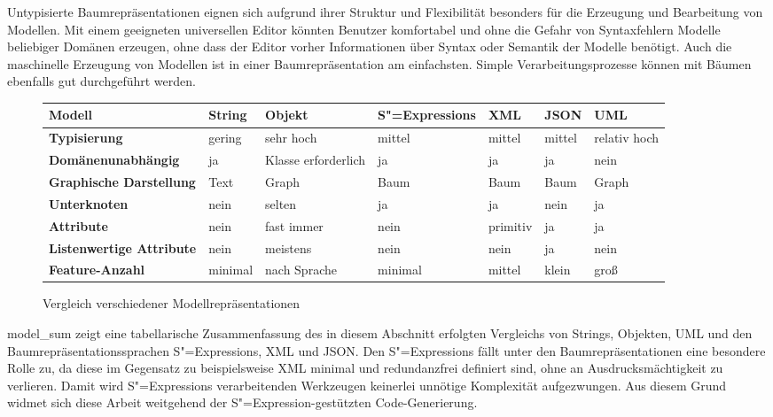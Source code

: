 \documentclass[12pt, a4paper, bibgerm]{scrbook}
\newcommand\abb{}
\newcommand{\sexp}{S"=Expression}
\newcommand{\sexps}{S"=Expressions}
\begin{document}
Untypisierte Baumrepräsentationen eignen sich aufgrund ihrer Struktur und
Flexibilität besonders für die Erzeugung und Bearbeitung von Modellen.
Mit einem geeigneten universellen Editor könnten Benutzer komfortabel
und ohne die Gefahr von Syntaxfehlern Modelle beliebiger Domänen
erzeugen, ohne dass der Editor vorher Informationen über Syntax oder
Semantik der Modelle benötigt. Auch die maschinelle Erzeugung von
Modellen ist in einer Baumrepräsentation am einfachsten. Simple
Verarbeitungsprozesse können mit Bäumen ebenfalls gut durchgeführt
werden.

\begin{figure}
  \centering
\begin{tabular}{|l|l|l|l|l|l|l|}\hline
\bf Modell                        & \bf String & \bf Objekt           & \bf \sexps{}    & \bf XML  & \bf JSON & \bf UML         \\\hline\hline
\bf Typisierung                   & gering     & sehr hoch            & mittel          & mittel   & mittel   & relativ hoch    \\\hline
\bf Domänenunabhängig             & ja         & Klasse erforderlich  & ja              & ja       & ja       & nein            \\\hline
\bf Graphische Darstellung        & Text       & Graph                & Baum            & Baum     & Baum     & Graph           \\\hline
\bf Unterknoten                   & nein       & selten               & ja              & ja       & nein     & ja              \\\hline
\bf Attribute                     & nein       & fast immer           & nein            & primitiv & ja       & ja              \\\hline
\bf Listenwertige Attribute       & nein       & meistens             & nein            & nein     & ja       & nein            \\\hline
\bf Feature-Anzahl                & minimal    & nach Sprache         & minimal         & mittel   & klein    & groß            \\\hline
\end{tabular}
  \caption{Vergleich verschiedener Modellrepräsentationen}
  \label{magicl:fig:model_sum}
\end{figure}

\abb{model_sum} zeigt eine tabellarische Zusammenfassung des in diesem
Abschnitt erfolgten Vergleichs von Strings, Objekten, UML und den
Baumrepräsentationssprachen \sexps{}, XML und JSON. Den \sexps{} fällt
unter den Baumrepräsentationen eine besondere Rolle zu, da diese im
Gegensatz zu beispielsweise XML minimal und redundanzfrei definiert
sind, ohne an Ausdrucksmächtigkeit zu verlieren. Damit wird \sexps{}
verarbeitenden Werkzeugen keinerlei unnötige Komplexität
aufgezwungen. Aus diesem Grund widmet sich diese Arbeit weitgehend der
\sexp-gestützten Code-Generierung.
\end{document}
